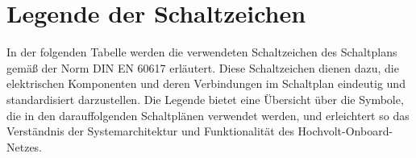 \section*{Legende der Schaltzeichen}
In der folgenden Tabelle werden die verwendeten Schaltzeichen des Schaltplans gemäß der Norm DIN EN 60617 erläutert. Diese Schaltzeichen dienen dazu, die elektrischen Komponenten und deren Verbindungen im Schaltplan eindeutig und standardisiert darzustellen. Die Legende bietet eine Übersicht über die Symbole, die in den darauffolgenden Schaltplänen verwendet werden, und erleichtert so das Verständnis der Systemarchitektur und Funktionalität des Hochvolt-Onboard-Netzes.
\begin{table}[ht]
	\centering
\end{table}
